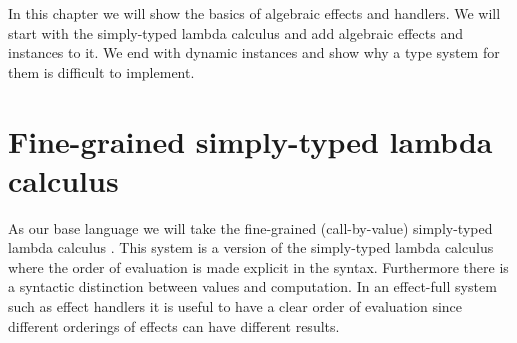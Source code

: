 {
\newcommand\ty[0]{\tau}
\newcommand\tunit[0]{()}
\newcommand\tarr[2]{#1 \rightarrow #2}
\newcommand\thandler[2]{#1 \Rightarrow #2}
\newcommand\tforall[3]{\forall(#1:#2) . #3}

\newcommand\cty[0]{\underline{\ty}}
\newcommand\aty[2]{#1 \; ! \; #2}
\newcommand\texists[3]{\exists(#1:#2) . #3}
\newcommand\texistss[2]{\exists \overrightarrow{#1} . #2}

\newcommand\val[0]{\nu}
\newcommand\vunit[0]{()}
\newcommand\vinst[1]{\mathsf{inst}(#1)}
\newcommand\vabst[3]{\Lambda(#1:#2) . #3}
\newcommand\vabs[2]{\lambda #1 . #2}
\newcommand\vappt[2]{#1 \; [ #2 ]}
\newcommand\vhandler[1]{\textit{handler} \; \{#1\}}
\newcommand\vhandleri[2]{\textit{handler} ( #1 ) \; \{#2\}}
\newcommand\vhandlerc[0]{\vhandler{
	\textit{return} \; x \rightarrow \comp,
	\op_1(x ; k) \rightarrow \comp,
	...,
	\op_n(x ; k) \rightarrow \comp
}}
\newcommand\vhandlerci[1]{\vhandleri{#1}{
	\textit{return} \; x \rightarrow \comp,
	\op_1(x ; k) \rightarrow \comp,
	...,
	\op_n(x ; k) \rightarrow \comp
}}

\newcommand\comp[0]{c}
\newcommand\creturn[1]{\mathsf{return} \; #1}
\newcommand\capp[2]{#1 \; #2}
\newcommand\cdo[3]{#1 \leftarrow #2 ; #3}
\newcommand\cop[4]{#1(#2 ; #3 . #4)}
\newcommand\copi[5]{#1 \# #2(#3 ; #4 . #5)}
\newcommand\chandle[2]{\textit{with} \; #1 \; \textit{handle} \; #2}
\newcommand\cnew[1]{\textit{new} \; #1}
\newcommand\cunpack[4]{(#1, #2) \leftarrow #3 ; #4}

In this chapter we will show the basics of algebraic effects and handlers. We will start with the simply-typed lambda calculus and add algebraic effects and instances to it. We end with dynamic instances and show why a type system for them is difficult to implement.

\section{Fine-grained simply-typed lambda calculus}

As our base language we will take the fine-grained (call-by-value) simply-typed lambda calculus \cite{fg-stlc}.
This system is a version of the simply-typed lambda calculus where the order of evaluation is made explicit in the syntax.
Furthermore there is a syntactic distinction between values and computation.
In an effect-full system such as effect handlers it is useful to have a clear order of evaluation since different orderings of effects can have different results.

}
